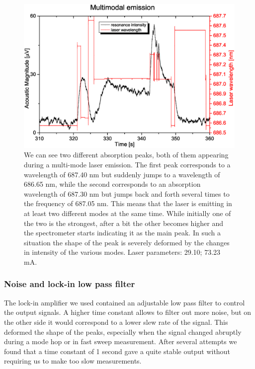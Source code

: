 \begin{figure}
\includegraphics[width=\linewidth, draft=\foto]{eps/multimode.eps}
\caption{We can see two different absorption peaks, both of them appearing during a multi-mode laser emission. The first peak corresponds to a wavelength of 687.40 nm but suddenly jumps to a wavelength of 686.65 nm, while the second corresponds to an absorption wavelength of 687.30 nm but jumps back and forth several times to the frequency of 687.05 nm. This means that the laser is emitting in at least two different modes at the same time. While initially one of the two is the strongest, after a bit the other becomes higher and the spectrometer starts indicating it as the main peak. In such a situation the shape of the peak is severely deformed by the changes in intensity of the various modes.
Laser parameters: 29.10\cel; 73.23 mA.}
\label{multimodes}
\end{figure} 

\subsubsection{Noise and lock-in low pass filter}
The lock-in amplifier we used contained an adjustable low pass filter to control the output signals. A higher time constant allows to filter out more noise, but on the other side it would correspond to a lower slew rate of the signal. This deformed the shape of the peaks, especially when the signal changed abruptly during a mode hop or in fast sweep measurement. After several attempts we found that a time constant of 1 second gave a quite stable output without requiring us to make too slow measurements.